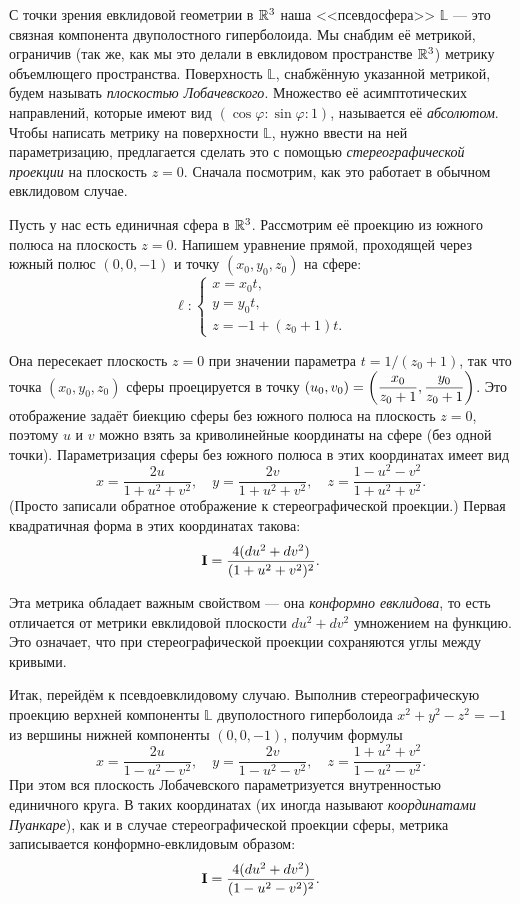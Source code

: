 С точки зрения евклидовой геометрии в $\mathbb{R}^3$ наша <<псевдосфера>> $\mathbb{L}$ --- это связная компонента двуполостного гиперболоида. Мы снабдим её метрикой, ограничив (так же, как мы это делали в евклидовом пространстве $\mathbb{R}^3$) метрику объемлющего пространства. Поверхность $\mathbb{L}$, снабжённую указанной метрикой, будем называть \textit{плоскостью Лобачевского}. Множество её асимптотических направлений, которые имеют вид $(\cos\varphi : \sin\varphi : 1)$, называется её \textit{абсолютом}. Чтобы написать метрику на поверхности $\mathbb{L}$, нужно ввести на ней параметризацию, предлагается сделать это с помощью \textit{стереографической проекции} на плоскость $z = 0$. Сначала посмотрим, как это работает в обычном евклидовом случае.

Пусть у нас есть единичная сфера в $\mathbb{R}^3$. Рассмотрим её проекцию из южного полюса на плоскость $z = 0$. Напишем уравнение прямой, проходящей через южный полюс $(0, 0, -1)$ и точку $(x_0, y_0, z_0)$ на сфере:
\[
	\ell\colon
	\begin{cases}
		x = x_0t,\\
		y = y_0t,\\
		z = -1 + (z_0 + 1)t.
	\end{cases}
\]

Она пересекает плоскость $z = 0$ при значении параметра $t = 1 / (z_0 + 1)$, так что точка $(x_0, y_0, z_0)$ сферы проецируется в точку $(u_0, v_0) = \displaystyle\left(\frac{x_0}{z_0 + 1}, \frac{y_0}{z_0 + 1}\right)$. Это отображение задаёт биекцию сферы без южного полюса на плоскость $z = 0$, поэтому $u$ и $v$ можно взять за криволинейные координаты на сфере (без одной точки). Параметризация сферы без южного полюса в этих координатах имеет вид
\[
	x = \frac{2u}{1 + u^2 + v^2},\quad y = \frac{2v}{1 + u^2 + v^2},\quad z = \frac{1 - u^2 - v^2}{1 + u^2 + v^2}.
\]
(Просто записали обратное отображение к стереографической проекции.) Первая квадратичная форма в этих координатах такова:
\[
	\boldsymbol{\operatorname{I}} = \frac{4(du^2 + dv^2)}{(1 + u^2 + v^2)^2}.
\]

Эта метрика обладает важным свойством --- она \textit{конформно евклидова}, то есть отличается от метрики евклидовой плоскости $du^2 + dv^2$ умножением на функцию. Это означает, что при стереографической проекции сохраняются углы между кривыми.

Итак, перейдём к псевдоевклидовому случаю. Выполнив стереографическую проекцию верхней компоненты $\mathbb{L}$ двуполостного гиперболоида $x^2 + y^2 - z^2 = -1$ из вершины нижней компоненты $(0, 0, -1)$, получим формулы
\[
	x = \frac{2u}{1 - u^2 - v^2},\quad y = \frac{2v}{1 - u^2 - v^2},\quad z = \frac{1 + u^2 + v^2}{1 - u^2 - v^2}.
\]
При этом вся плоскость Лобачевского параметризуется внутренностью единичного круга. В таких координатах (их иногда называют \textit{координатами Пуанкаре}), как и в случае стереографической проекции сферы, метрика записывается конформно-евклидовым образом:
\begin{equation} \label{eq:PoincareMetrics}
	\boldsymbol{\operatorname{I}} = \frac{4(du^2 + dv^2)}{(1 - u^2 - v^2)^2}.
\end{equation}

